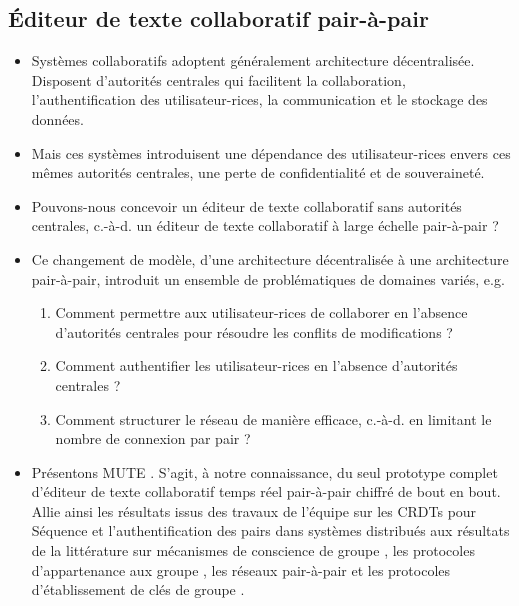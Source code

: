 \documentclass[12pt]{thesul}
\theoremstyle{definition}
\newcommand{\eg}{e.g.\xspace}
\newcommand{\ie}{c.-à-d.\xspace}
\begin{document}
\subsection{Éditeur de texte collaboratif pair-à-pair}

\begin{itemize}
  \item Systèmes collaboratifs adoptent généralement architecture décentralisée.
    Disposent d'autorités centrales qui facilitent la collaboration, l'authentification des utilisateur-rices, la communication et le stockage des données.
  \item Mais ces systèmes introduisent une dépendance des utilisateur-rices envers ces mêmes autorités centrales, une perte de confidentialité et de souveraineté.
  \item Pouvons-nous concevoir un éditeur de texte collaboratif sans autorités centrales, \ie un éditeur de texte collaboratif à large échelle pair-à-pair ?
  \item Ce changement de modèle, d'une architecture décentralisée à une architecture pair-à-pair, introduit un ensemble de problématiques de domaines variés, \eg
    \begin{enumerate}
      \item Comment permettre aux utilisateur-rices de collaborer en l'absence d'autorités centrales pour résoudre les conflits de modifications ?
      \item Comment authentifier les utilisateur-rices en l'absence d'autorités centrales ?
      \item Comment structurer le réseau de manière efficace, \ie en limitant le nombre de connexion par pair ?
    \end{enumerate}
  \item Présentons \ac{MUTE} \cite{MUTE2017}.
    S'agit, à notre connaissance, du seul prototype complet d'éditeur de texte collaboratif temps réel pair-à-pair chiffré de bout en bout.
    Allie ainsi les résultats issus des travaux de l'équipe sur les \acp{CRDT} pour Séquence \cite{2013-logootsplit,2021-these-vic} et l'authentification des pairs dans systèmes distribués \cite{2018-trusternity-short,2018-trusternity-long} aux résultats de la littérature sur mécanismes de conscience de groupe , les protocoles d'appartenance aux groupe \cite{swim2002, lifeguard2018}, les réseaux pair-à-pair \cite{2018-spray-nedelec} et les protocoles d'établissement de clés de groupe \cite{1995-burmester-desmedt}.
\end{itemize}
\end{document}
